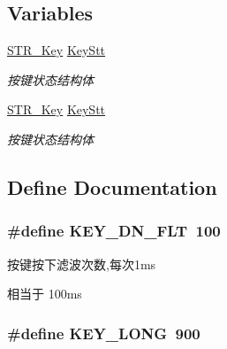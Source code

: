 \subsection*{\-Variables}
\begin{DoxyCompactItemize}
\item 
\hypertarget{group___k_e_y_ga16e6f341748e390fbbc27d40a89053a1}{\hyperlink{struct_s_t_r___key}{\-S\-T\-R\-\_\-\-Key} \hyperlink{group___k_e_y_ga16e6f341748e390fbbc27d40a89053a1}{\-Key\-Stt}}\label{group___k_e_y_ga16e6f341748e390fbbc27d40a89053a1}

\begin{DoxyCompactList}\small\item\em 按键状态结构体 \end{DoxyCompactList}\item 
\hypertarget{group___k_e_y_ga16e6f341748e390fbbc27d40a89053a1}{\hyperlink{struct_s_t_r___key}{\-S\-T\-R\-\_\-\-Key} \hyperlink{group___k_e_y_ga16e6f341748e390fbbc27d40a89053a1}{\-Key\-Stt}}\label{group___k_e_y_ga16e6f341748e390fbbc27d40a89053a1}

\begin{DoxyCompactList}\small\item\em 按键状态结构体 \end{DoxyCompactList}\end{DoxyCompactItemize}


\subsection{\-Define \-Documentation}
\hypertarget{group___k_e_y_ga38599380071fb33212aa3fd543bae31b}{
\subsubsection[{\-K\-E\-Y\-\_\-\-D\-N\-\_\-\-F\-L\-T}]{\setlength{\rightskip}{0pt plus 5cm}\#define {\bf \-K\-E\-Y\-\_\-\-D\-N\-\_\-\-F\-L\-T}~100}}\label{group___k_e_y_ga38599380071fb33212aa3fd543bae31b}


按键按下滤波次数,每次1ms 

相当于 100ms \hypertarget{group___k_e_y_ga69ed1676c835686c30dbdc821661954b}{
\subsubsection[{\-K\-E\-Y\-\_\-\-L\-O\-N\-G}]{\setlength{\rightskip}{0pt plus 5cm}\#define {\bf \-K\-E\-Y\-\_\-\-L\-O\-N\-G}~900}}\label{group___k_e_y_ga69ed1676c835686c30dbdc821661954b}


